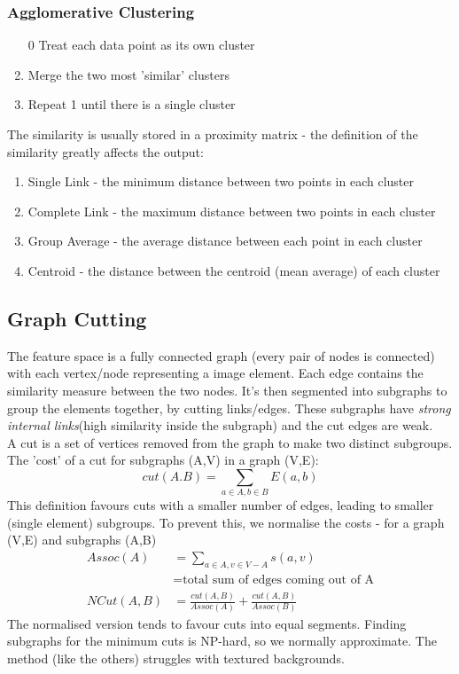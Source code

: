 \subsubsection{Agglomerative Clustering} 
\begin{enumerate}
    \item [0] Treat each data point as its own cluster
    \item Merge the two most 'similar' clusters
    \item Repeat 1 until there is a single cluster
\end{enumerate}
The similarity is usually stored in a proximity matrix - the definition of the similarity greatly affects the output:
\begin{enumerate}
    \item Single Link - the minimum distance between two points in each cluster
    \item Complete Link - the maximum distance between two points in each cluster
    \item Group Average - the average distance between each point in each cluster
    \item Centroid - the distance between the centroid (mean average) of each cluster
\end{enumerate}

\subsection{Graph Cutting}
The feature space is a fully connected graph (every pair of nodes is connected) with each vertex/node representing a image element. Each edge contains the similarity measure between the two nodes. It's then segmented into subgraphs to group the elements together, by cutting links/edges. These subgraphs have \emph{strong internal links}(high similarity inside the subgraph) and the cut edges are weak.\\

A cut is a set of vertices removed from the graph to make two distinct subgroups. The 'cost' of a cut for subgraphs (A,V) in a graph (V,E): 
\begin{equation}
    cut(A.B) = \sum_{a\in A, b\in B} E(a,b)
\end{equation}
This definition favours cuts with a smaller number of edges, leading to smaller (single element) subgroups. To prevent this, we normalise the costs - for a graph (V,E) and subgraphs (A,B)
\begin{align}
    Assoc(A)&= \sum_{a\in A, v\in V-A} s(a,v) \\
            &= \text{total sum of edges coming out of A} \nonumber\\
    NCut(A,B) &=  \frac{cut(A,B)}{Assoc(A)} + \frac{cut(A,B)}{Assoc(B)}      
\end{align}
The normalised version tends to favour cuts into equal segments. Finding subgraphs for the minimum cuts is NP-hard, so we normally approximate. The method (like the others) struggles with textured backgrounds.

